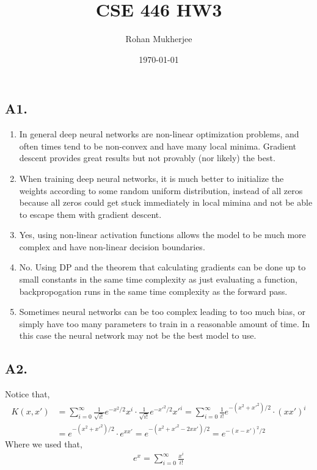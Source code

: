 \documentclass[12pt]{article}
\title{CSE 446 HW3}
\date{\today}
\author{Rohan Mukherjee}
\theoremstyle{definitionstyle}
\begin{document}
    \maketitle
    \subsection*{A1.}
    \begin{enumerate}[label=(\alph*)]
        \item In general deep neural networks are non-linear optimization problems, and often times tend to be non-convex and have many local minima. Gradient descent provides great results but not provably (nor likely) the best.
        \item When training deep neural networks, it is much better to initialize the weights according to some random uniform distribution, instead of all zeros because all zeros could get stuck immediately in local mimina and not be able to escape them with gradient descent.
        \item Yes, using non-linear activation functions allows the model to be much more complex and have non-linear decision boundaries. 
        \item No. Using DP and the theorem that calculating gradients can be done up to small constants in the same time complexity as just evaluating a function, backpropogation runs in the same time complexity as the forward pass.
        \item Sometimes neural networks can be too complex leading to too much bias, or simply have too many parameters to train in a reasonable amount of time. In this case the neural network may not be the best model to use. 
    \end{enumerate}

    \subsection*{A2.}
    Notice that,
    \begin{align*}
        K(x,x') &= \sum_{i=0}^\infty \frac{1}{\sqrt{i!}} e^{-x^2/2}x^i \cdot \frac{1}{\sqrt{i!}} e^{-x'^2/2}x'^i = \sum_{i=0}^\infty \frac{1}{i!} e^{-(x^2+x'^2)/2} \cdot (xx')^i \\
        &= e^{-(x^2+x'^2)/2} \cdot e^{xx'} = e^{-(x^2+x'^2-2xx')/2} = e^{-(x-x')^2/2}
    \end{align*}
    Where we used that,
    \begin{align*}
        e^x = \sum_{i=0}^\infty \frac{x^i}{i!}
    \end{align*}
\end{document}
